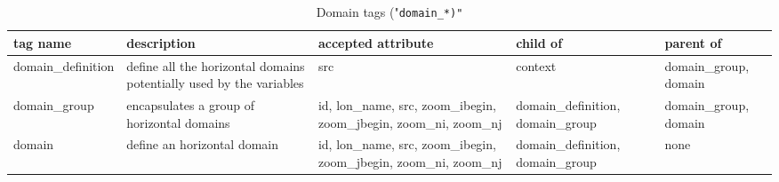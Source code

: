 \documentclass[../tex_main/NEMO_manual]{subfiles}
\begin{document}
\begin{table} \scriptsize
	\begin{tabularx}{\textwidth}{|l|X|X|X|X|} \hline
	tag name                                                            & 
	description                                                         & 
	accepted attribute                                                  & 
	child of                                                            & 
	parent of               \\ \hline \hline
	domain\_\-definition                                                & 
	define all the horizontal domains potentially used by the variables & 
	src                                                                 & 
	context                                                             & 
	domain\_\-group, domain \\ \hline
	domain\_group                                                       & 
	encapsulates a group of horizontal domains                          & 
	id, lon\_name, src, zoom\_ibegin, zoom\_jbegin, zoom\_ni, zoom\_nj  & 
	domain\_\-definition, domain\_group                                 & 
	domain\_\-group, domain \\ \hline
	domain                                                              & 
	define an horizontal domain                                         & 
	id, lon\_name, src, zoom\_ibegin, zoom\_jbegin, zoom\_ni, zoom\_nj  & 
	domain\_\-definition, domain\_group                                 & 
	none                    \\ \hline
	\end{tabularx}
	\caption{Domain tags ("\tt{domain\_*)}"}
\end{table}
\end{document}
